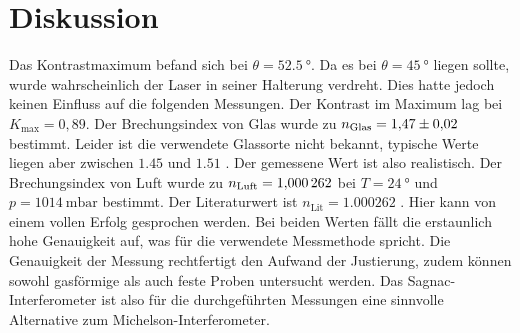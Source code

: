 \section{Diskussion}
Das Kontrastmaximum befand sich bei $\theta = \SI{52.5}{°}$. Da es bei $\theta = \SI{45}{°}$ liegen sollte, wurde wahrscheinlich der Laser in seiner Halterung verdreht. Dies hatte jedoch keinen Einfluss auf die folgenden Messungen. Der Kontrast im Maximum lag bei $K_\text{max} = 0,89$.
Der Brechungsindex von Glas wurde zu
$n_\text{Glas}=\num{1,47 \pm 0,02}$
bestimmt.
Leider ist die verwendete Glassorte nicht bekannt,
typische Werte liegen aber zwischen $\num{1,45}$ und
 $\num{1,51}$ \cite{filmetrics}. Der gemessene Wert ist also realistisch.
Der Brechungsindex von Luft wurde zu $n_\text{Luft}=\num{1,000262 \pm 0,000000}$ bei $T=\SI{24}{°}$ und $p=\SI{1014}{\milli \bar}$ bestimmt. Der Literaturwert ist $n_\text{Lit}=\num{1,000262}$ \cite{spektrum}. Hier kann von
einem vollen Erfolg gesprochen werden. Bei beiden Werten fällt die erstaunlich hohe Genauigkeit auf, was für die verwendete Messmethode spricht. Die Genauigkeit der Messung rechtfertigt den Aufwand der Justierung, zudem können sowohl gasförmige als auch feste Proben untersucht werden. Das Sagnac-Interferometer ist also für die durchgeführten Messungen eine sinnvolle Alternative zum Michelson-Interferometer.
\label{sec:Diskussion}

